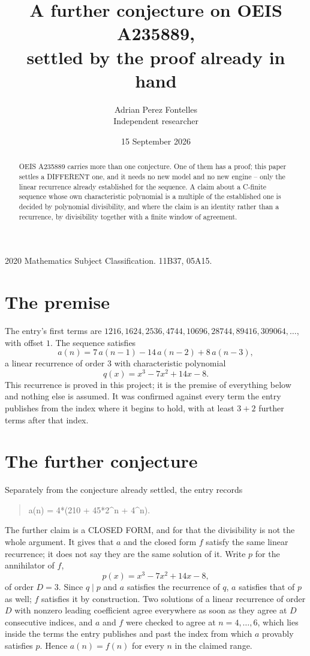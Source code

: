 \documentclass[11pt,a4paper]{article}
\title{A further conjecture on OEIS A235889,\\ \large settled by the proof already in hand}
\author{Adrian Perez Fontelles\\ \small Independent researcher}
\date{15 September 2026}
\theoremstyle{plain}
\theoremstyle{definition}
\begin{document}
\maketitle

\begin{abstract}
OEIS A235889 carries more than one conjecture. One of them has a proof; this paper settles a
DIFFERENT one, and it needs no new model and no new engine -- only the linear recurrence already
established for the sequence. A claim about a C-finite sequence whose own characteristic
polynomial is a multiple of the established one is decided by polynomial divisibility, and where
the claim is an identity rather than a recurrence, by divisibility together with a finite window
of agreement.
\end{abstract}

\noindent\small 2020 Mathematics Subject Classification. 11B37, 05A15.\normalsize

\section{The premise}

The entry's first terms are $1216, 1624, 2536, 4744, 10696, 28744, 89416, 309064,\dots$, with offset $1$. The sequence satisfies
\[
  a(n)=7\,a(n-1) - 14\,a(n-2) + 8\,a(n-3) ,
\]
a linear recurrence of order $3$ with characteristic polynomial
\[
  q(x)=x^{3} - 7 x^{2} + 14 x - 8 .
\]
This recurrence is proved in this project; it is the premise of everything below and nothing else is assumed.
It was confirmed against every term the entry publishes from the index where it begins to hold,
with at least $3+2$ further terms after that index.

\section{The further conjecture}

Separately from the conjecture already settled, the entry records

\begin{quote}\raggedright a(n) = 4*(210 + 45*2\^{}n + 4\^{}n).\end{quote}

The further claim is a CLOSED FORM, and for that the divisibility is not the whole argument. It
gives that $a$ and the closed form $f$ satisfy the same linear recurrence; it does not say they
are the same solution of it. Write $p$ for the annihilator of $f$,
\[
  p(x)=x^{3} - 7 x^{2} + 14 x - 8 ,
\]
of order $D=3$. Since $q\mid p$ and $a$ satisfies the recurrence of $q$, $a$ satisfies that of
$p$ as well; $f$ satisfies it by construction. Two solutions of a linear recurrence of order $D$
with nonzero leading coefficient agree everywhere as soon as they agree at $D$ consecutive
indices, and $a$ and $f$ were checked to agree at $n=4,\dots,6$,
which lies inside the terms the entry publishes and past the index from which $a$ provably
satisfies $p$. Hence $a(n)=f(n)$ for every $n$ in the claimed range.
\end{document}
